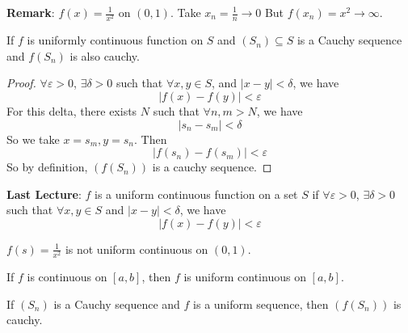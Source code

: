 \documentclass{report}
\begin{document}
\textbf{Remark}: $f(x) = \frac{1}{x^{2}}$ on $(0, 1)$. Take $x_{n} = \frac{1}{n} \rightarrow 0$ But $f(x_{n}) = x^{2} \rightarrow \infty$.

\begin{theorem}{19.4}
    If $f$ is uniformly continuous function on $S$ and $(S_{n}) \subseteq S$ is a Cauchy sequence and $f(S_{n})$ is also cauchy.
\end{theorem}

\begin{proof}
    $\forall \varepsilon> 0$, $\exists \delta> 0$ such that $\forall x, y \in S$, and $\lvert x - y \rvert <  \delta$, we have
        \begin{equation*}
            \lvert f(x) - f(y) \rvert < \varepsilon
        \end{equation*}
    For this delta, there exists $N$ such that $\forall n, m> N$, we have
        \begin{equation*}
            \lvert  s_{n} - s_{m} \rvert < \delta
        \end{equation*}
    So we take $x = s_{m}, y = s_{n}$. Then 
        \begin{equation*}
            \lvert f(s_{n}) - f(s_{m}) \rvert<  \varepsilon
        \end{equation*}
    So by definition, $(f(S_{n}))$ is a cauchy sequence.
\end{proof}

\textbf{Last Lecture}: $f$ is a uniform continuous function on a set $S$ if $\forall \varepsilon > 0$, $\exists \delta > 0$ such that $\forall x, y \in S$ and $\lvert x - y \rvert < \delta$, we have 
    \begin{equation*}
        \lvert f(x) - f(y) \rvert < \varepsilon
    \end{equation*}
\begin{examples}
    \begin{example}
        $f(s) = \frac{1}{x^{2}}$ is not uniform continuous on $(0, 1)$.
    \end{example}
\end{examples}

\begin{theorem}{19.2}
    If $f$ is continuous on $[a, b]$, then $f$ is uniform continuous on $[a, b]$.
\end{theorem}

\begin{theorem}{19.4}
    If $(S_{n})$ is a Cauchy sequence and $f$ is a uniform sequence, then $(f(S_{n}))$ is cauchy.
\end{theorem}
\end{document}
